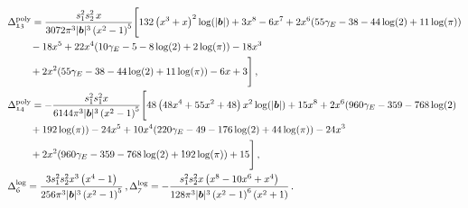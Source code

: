 \begin{align}
\begin{split}
&\Delta_{\mathfrak{13}}^{\textrm{poly}}=\frac{s_1^2s_2^2\,x}{3072 \pi ^3 |\boldsymbol{b}|^3 \left(x^2-1\right)^5}\Bigg[132 \left(x^3+x\right)^2 \log (|\boldsymbol{b}|)+3 x^8-6 x^7+2 x^6 (55 \gamma_E -38-44 \log (2)+11 \log (\pi ))\\&\hspace{0.8cm}-18 x^5+22 x^4 (10 \gamma_E -5-8 \log (2)+2 \log (\pi ))-18 x^3\\&\hspace{0.8cm}+2 x^2 (55 \gamma_E -38-44 \log (2)+11 \log (\pi ))-6 x+3\Bigg]\,,\\&
\Delta_{\mathfrak{14}}^{\textrm{poly}}=-\frac{s_1^2s_1^2 x}{6144 \pi ^3 |\boldsymbol{b}|^3 \left(x^2-1\right)^5 }\Bigg[48 \left(48 x^4+55 x^2+48\right) x^2 \log (|\boldsymbol{b}|)+15 x^8+2 x^6 (960 \gamma_E -359-768 \log (2)\\&\hspace{0.8cm}+192 \log (\pi ))-24 x^5+10 x^4 (220 \gamma_ E -49-176 \log (2)+44 \log (\pi ))-24 x^3\\&\hspace{0.8cm}+2 x^2 (960 \gamma_E -359-768 \log (2)+192 \log (\pi ))+15\Bigg]\,,\\&
\Delta_{\mathfrak{6}}^{\textrm{log}}=\frac{3s_1^2 s_2^2 x^3 \left(x^4-1\right)}{256 \pi ^3 |\boldsymbol{b}|^3 \left(x^2-1\right)^5 }\,,\Delta_{\mathfrak{7}}^{\textrm{log}}=-\frac{s_1^2 s_2^2 x \left(x^8-10 x^6+x^4\right)}{128 \pi ^3 |\boldsymbol{b}|^3 \left(x^2-1\right)^6 \left(x^2+1\right) }\,.
\end{split}
\end{align}
